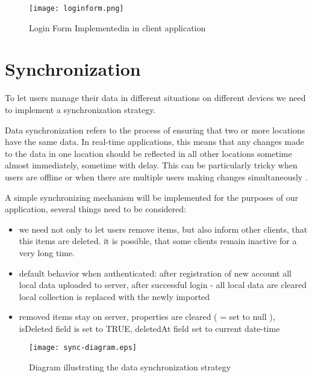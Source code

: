 \begin{figure}[H]
    \centering
    \texttt{[image: loginform.png]}
    \caption[Proof-of-concept Login form]{\label{fig:loginform} Login Form Implementedin in client application }
\end{figure}


\section{{Synchronization}}%
\label{sec:synchronization}

To let users manage their data in different situations on different devices we need to implement a synchronization strategy. 

Data synchronization refers to the process of ensuring that two or more locations have the same data. In real-time applications, this means that any changes made to the data in one location should be reflected in all other locations sometime almost immediately, sometime with delay. This can be particularly tricky when users are offline or when there are multiple users making changes simultaneously \autocite{SyncPeerDH}.

A simple synchronizing mechanism will be implemented for the purposes of our application, several things need to be considered:
\begin{itemize}
    \item we need not only to let users remove items, but also inform other clients, that this items are deleted. it is possible, that some clients remain inactive for a very long time.
    \item default behavior when authenticated: after registration of new account all local data uploaded to server, after successful login - all local data are cleared local collection is replaced with the newly imported
    \item removed items stay on server, properties are cleared ( = set to null ), isDeleted field is set to TRUE, deletedAt field set to current date-time
\end{itemize}

\begin{figure}[H]
    \centering
    \texttt{[image: sync-diagram.eps]}
    \caption[Synchronization strategy diagram]{\label{fig:syncdiagram} Diagram illustrating the data synchronization strategy  }
\end{figure}

